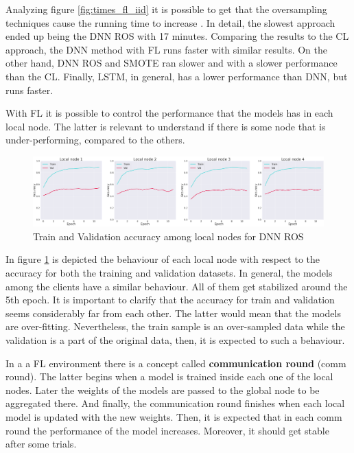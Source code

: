 Analyzing figure \ref{fig:times_fl_iid} it is possible to get that the oversampling techniques cause the running time to increase \cite{fl28}. In detail, the slowest approach ended up being the DNN ROS with 17 minutes. Comparing the results to the CL approach, the DNN method with FL runs faster with similar results. On the other hand, DNN ROS and SMOTE ran slower and with a slower performance than the CL. Finally, LSTM, in general, has a lower performance than DNN, but runs faster.

With FL it is possible to control the performance that the models has in each local node. The latter is relevant to understand if there is some node that is under-performing, compared to the others.

\begin{figure}[H]
\centering
\includegraphics[scale=0.4]{img/iid_local_nodes_acc.png}
\caption{Train and Validation accuracy among local nodes for DNN ROS}
\label{fig:iid_local_nodes_acc}
\end{figure}

In figure \ref{fig:iid_local_nodes_acc} is depicted the behaviour of each local node with respect to the accuracy for both the training and validation datasets. In general, the models among the clients have a similar behaviour. All of them get stabilized around the 5th epoch. It is important to clarify that the accuracy for train and validation seems considerably far from each other. The latter would mean that the models are over-fitting. Nevertheless, the train sample is an over-sampled data while the validation is a part of the original data, then, it is expected to such a behaviour.

In a a FL environment there is a concept called \textbf{communication round} (comm round). The latter begins when a model is trained inside each one of the local nodes. Later the weights of the models are passed to the global node to be aggregated there. And finally, the communication round finishes when each local model is updated with the new weights. Then, it is expected that in each comm round the performance of the model increases. Moreover, it should get stable after some trials.

